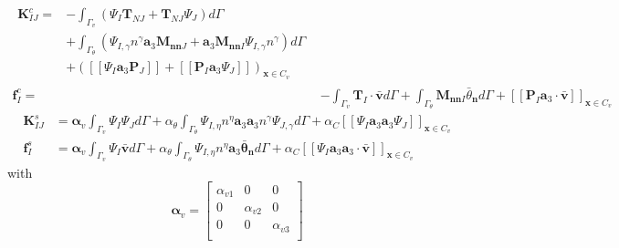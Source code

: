 \begin{subequations}\label{nde2}
\begin{align}
\begin{split}
\boldsymbol K^c_{IJ} = &- \int_{\Gamma_v} (\Psi_I \boldsymbol T_{NJ} + \boldsymbol T_{NJ} \Psi_J) d\Gamma \\
                                     &+ \int_{\Gamma_\theta} (\Psi_{I,\gamma} n^\gamma \boldsymbol a_3 \boldsymbol M_{\boldsymbol{nn}J} + \boldsymbol a_3 \boldsymbol M_{\boldsymbol{nn}I} \Psi_{I,\gamma}n^\gamma)d\Gamma \\
                                     & + ([[\Psi_I \boldsymbol a_3 \boldsymbol P_J]] + [[\boldsymbol P_I \boldsymbol a_3 \Psi_J]])_{\boldsymbol x \in C_v}
\end{split} \\
\boldsymbol f^c_I = &- \int_{\Gamma_v} \boldsymbol T_I \cdot \bar{\boldsymbol v} d\Gamma + \int_{\Gamma_\theta} \boldsymbol M_{\boldsymbol{nn}I} \bar{\theta}_{\boldsymbol n} d\Gamma + [[\boldsymbol P_I\boldsymbol a_3 \cdot \bar{\boldsymbol v}]]_{\boldsymbol x \in C_v}
\end{align}
\end{subequations}
\begin{subequations}\label{nde3}
\begin{align}
\boldsymbol K^s_{IJ} &= \boldsymbol \alpha_v \int_{\Gamma_v} \Psi_I \Psi_J d\Gamma 
+ \alpha_\theta \int_{\Gamma_\theta} \Psi_{I,\eta} n^\eta \boldsymbol a_3 \boldsymbol a_3 n^\gamma\Psi_{J,\gamma} d\Gamma + \alpha_C [[\Psi_I \boldsymbol a_3 \boldsymbol a_3 \Psi_J]]_{\boldsymbol x \in C_v} \\
\boldsymbol f^s_I &= \boldsymbol \alpha_v \int_{\Gamma_v} \Psi_I \bar{\boldsymbol v} d\Gamma + \alpha_\theta \int_{\Gamma_\theta} \Psi_{I,\eta} n^\eta \boldsymbol a_3 \boldsymbol \bar \theta_{\boldsymbol n} d\Gamma + \alpha_C [[\Psi_I \boldsymbol a_3 \boldsymbol a_3 \cdot \bar{\boldsymbol v}]]_{\boldsymbol x \in C_v}
\end{align}
\end{subequations}
with
\begin{equation}
\boldsymbol \alpha_v = \begin{bmatrix}
    \alpha_{v1} & 0 & 0 \\
    0 & \alpha_{v2} & 0 \\
    0 & 0 & \alpha_{v3} \\
\end{bmatrix}
\end{equation}

